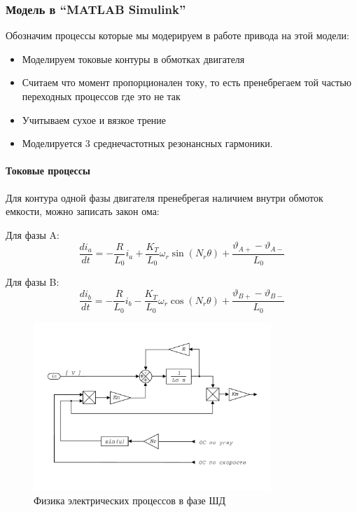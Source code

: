 \subsubsection{Модель в ``MATLAB Simulink''}
Обозначим процессы которые мы модерируем в работе привода на этой модели:

\begin{itemize}
    \item Моделируем токовые контуры в обмотках двигателя
    \item Считаем что момент пропорционален току, то есть пренебрегаем той частью переходных
            процессов где это не так
    \item Учитываем сухое и вязкое трение
    \item Моделируется 3 среднечастотных резонансных гармоники. %
\end{itemize}

\paragraph{ Токовые процессы }
Для контура одной фазы двигателя пренебрегая наличием внутри обмоток емкости, можно записать
закон ома:

Для фазы A:
\begin{equation}
    \frac{di_{a}}{dt} =
        - \frac{R}{L_{0}} i_{a}
        + \frac{K_{T}}{L_{0}} \omega_{r} \sin(N_{r}\theta)
        + \frac{\vartheta_{A+} - \vartheta_{A-}}{L_{0}}
\end{equation}

Для фазы B:
\begin{equation}
    \frac{di_{b}}{dt} =
        - \frac{R}{L_{0}} i_{b}
        - \frac{K_{T}}{L_{0}} \omega_{r} \cos(N_{r}\theta)
        + \frac{\vartheta_{B+} - \vartheta_{B-}}{L_{0}}
\end{equation}

\begin{figure}[ht!]
    \centering
    \includegraphics[width=0.8\textwidth, keepaspectratio]
                    {./src/pictures/drive_model/drive_model_current_equation}
    \caption{Физика электрических процессов в фазе ШД}
    \label{pic_drive_model_current_equation}
\end{figure}

